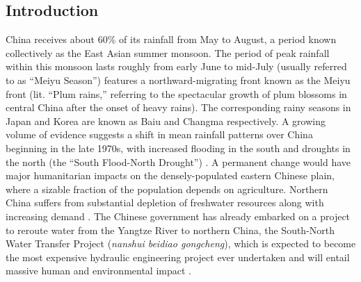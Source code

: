 \documentclass[draft,grl]{AGUTeX}
\begin{document}
\begin{article}




\section{Introduction}
 
 	China receives about 60\% of its rainfall from May to August, a period known collectively as the East Asian summer monsoon. The period of peak rainfall within this monsoon lasts roughly from early June to mid-July (usually referred to as ``Meiyu Season'') features a northward-migrating front known as the Meiyu front (lit. ``Plum rains,'' referring to the spectacular growth of plum blossoms in central China after the onset of heavy rains). The corresponding rainy seasons in Japan and Korea are known as Baiu and Changma respectively. A growing volume of evidence suggests a shift in mean rainfall patterns over China beginning in the late 1970s, with increased flooding in the south and droughts in the north (the ``South Flood-North Drought'') \citep{Hu1997,Gong2002,Nigam2013}. A permanent change would have major humanitarian impacts on the densely-populated eastern Chinese plain, where a sizable fraction of the population depends on agriculture. Northern China suffers from substantial depletion of freshwater resources along with increasing demand \citep{Currell2012,Gleeson2012}. The Chinese government has already embarked on a project to reroute water from the Yangtze River to northern China, the South-North Water Transfer Project (\textit{nanshui beidiao gongcheng}), which is expected to become the most expensive hydraulic engineering project ever undertaken and will entail massive human and environmental impact \citep{Magee2011}.
 

\end{article}
\end{document}
